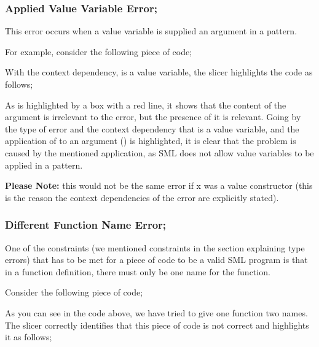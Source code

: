 \documentclass{article}
\begin{document}
\begin{itemize}
\subsubsection{Applied Value Variable Error;}

\subitem This error occurs when a value variable is supplied an
argument in a pattern.

For example, consider the following piece of code;


With the context dependency,  is a value variable,
 the slicer highlights the code as follows;


As  is highlighted by a box with a red line, it shows
that the content of the argument is irrelevant to the error, but the
presence of it is relevant. Going by the type of error and the context
dependency that  is a value variable, and the
application of  to an argument () is
highlighted, it is clear that the problem is caused by the mentioned
application, as SML does not allow value variables to be applied in a
pattern.

\textbf{Please Note:} this would not be the same error if x was a value
constructor (this is the reason the context dependencies of the error are
explicitly stated).


\vspace{0.5in}


\subsubsection{Different Function Name Error;}

  \subitem One of the constraints (we mentioned constraints in the
  section explaining type errors) that has to be met for a piece of
  code to be a valid SML program is that in a function definition,
  there must only be one name for the function.

Consider the following piece of code;


As you can see in the code above, we have tried to give one function
two names. The slicer correctly identifies that this piece of code is
not correct and highlights it as follows;


\end{itemize}
\end{document}

